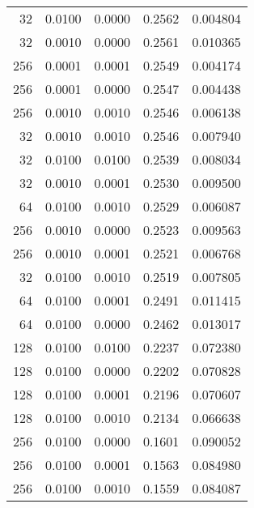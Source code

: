\begin{tabular}{rrrrr}
  32 &  0.0100 &  0.0000 &  0.2562 &  0.004804 \\
  32 &  0.0010 &  0.0000 &  0.2561 &  0.010365 \\
 256 &  0.0001 &  0.0001 &  0.2549 &  0.004174 \\
 256 &  0.0001 &  0.0000 &  0.2547 &  0.004438 \\
 256 &  0.0010 &  0.0010 &  0.2546 &  0.006138 \\
  32 &  0.0010 &  0.0010 &  0.2546 &  0.007940 \\
  32 &  0.0100 &  0.0100 &  0.2539 &  0.008034 \\
  32 &  0.0010 &  0.0001 &  0.2530 &  0.009500 \\
  64 &  0.0100 &  0.0010 &  0.2529 &  0.006087 \\
 256 &  0.0010 &  0.0000 &  0.2523 &  0.009563 \\
 256 &  0.0010 &  0.0001 &  0.2521 &  0.006768 \\
  32 &  0.0100 &  0.0010 &  0.2519 &  0.007805 \\
  64 &  0.0100 &  0.0001 &  0.2491 &  0.011415 \\
  64 &  0.0100 &  0.0000 &  0.2462 &  0.013017 \\
 128 &  0.0100 &  0.0100 &  0.2237 &  0.072380 \\
 128 &  0.0100 &  0.0000 &  0.2202 &  0.070828 \\
 128 &  0.0100 &  0.0001 &  0.2196 &  0.070607 \\
 128 &  0.0100 &  0.0010 &  0.2134 &  0.066638 \\
 256 &  0.0100 &  0.0000 &  0.1601 &  0.090052 \\
 256 &  0.0100 &  0.0001 &  0.1563 &  0.084980 \\
 256 &  0.0100 &  0.0010 &  0.1559 &  0.084087 \\
\bottomrule
\end{tabular}
